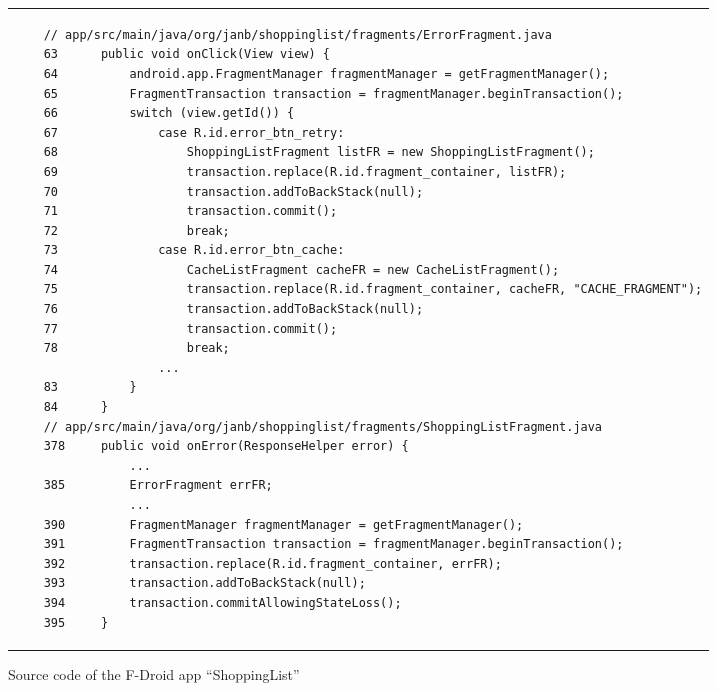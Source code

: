 \begin{figure}[htbp]
    \centering
    \begin{tabular*}{\linewidth}{l}
    \begin{lstlisting}
    // app/src/main/java/org/janb/shoppinglist/fragments/ErrorFragment.java 
    63      public void onClick(View view) {
    64          android.app.FragmentManager fragmentManager = getFragmentManager();
    65          FragmentTransaction transaction = fragmentManager.beginTransaction();
    66          switch (view.getId()) {
    67              case R.id.error_btn_retry:
    68                  ShoppingListFragment listFR = new ShoppingListFragment();
    69                  transaction.replace(R.id.fragment_container, listFR);
    70                  transaction.addToBackStack(null);
    71                  transaction.commit();
    72                  break;
    73              case R.id.error_btn_cache:
    74                  CacheListFragment cacheFR = new CacheListFragment();
    75                  transaction.replace(R.id.fragment_container, cacheFR, "CACHE_FRAGMENT");
    76                  transaction.addToBackStack(null);
    77                  transaction.commit();
    78                  break;
                    ...
    83          }
    84      }
    // app/src/main/java/org/janb/shoppinglist/fragments/ShoppingListFragment.java 
    378     public void onError(ResponseHelper error) {
                ...
    385         ErrorFragment errFR;
                ...
    390         FragmentManager fragmentManager = getFragmentManager();
    391         FragmentTransaction transaction = fragmentManager.beginTransaction();
    392         transaction.replace(R.id.fragment_container, errFR);
    393         transaction.addToBackStack(null);
    394         transaction.commitAllowingStateLoss();
    395     }

    \end{lstlisting}
    \end{tabular*}
    \caption{Source code of the F-Droid app ``ShoppingList''}
    \label{code-shoplist}
    \end{figure}

